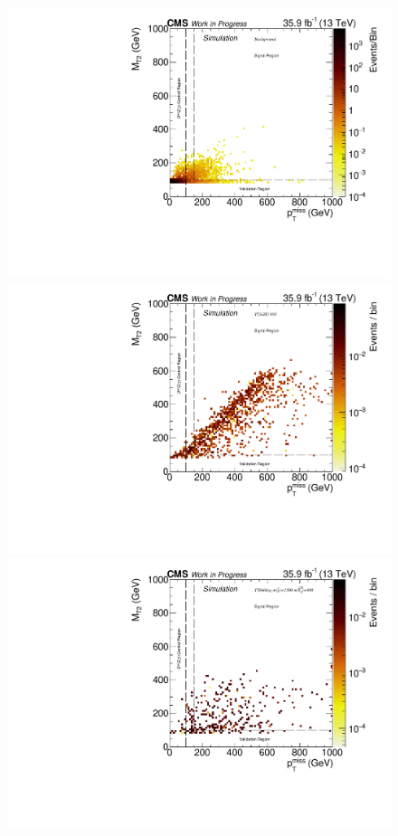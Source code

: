 \begin{figure}[htb]
 \centering
 \includegraphics[width=\pairwidth]{figures/plots_2d/DataMC_sameHistograms_LL+signal_onZ__LL__MetMt2_bkg_}
 \includegraphics[width=\pairwidth]{figures/plots_2d/DataMC_sameHistograms_LL+signal_onZ__LL__MetMt2_SIG_tching600_}\\
 \includegraphics[width=\pairwidth]{figures/plots_2d/DataMC_sameHistograms_LL+signal_onZ__LL__MetMt2_SIG_t5bbbbzg_1500_400_}

\end{figure}
